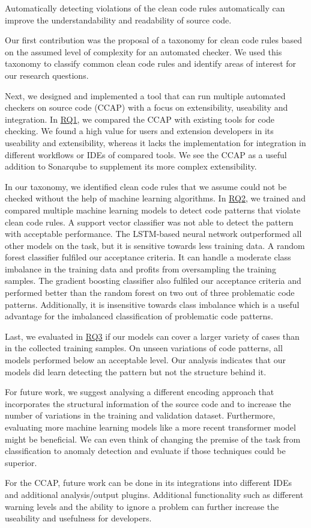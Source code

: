 

Automatically detecting violations of the clean code rules automatically can improve the understandability and readability of source code. 

Our first contribution was the proposal of a taxonomy for clean code rules based on the assumed level of complexity for an automated checker.
We used this taxonomy to classify common clean code rules and identify areas of interest for our research questions.

Next, we designed and implemented a tool that can run multiple automated checkers on source code (CCAP) with a focus on extensibility, useability and integration. In \hyperref[rq:1]{RQ1}, we compared the CCAP with existing tools for code checking. We found a high value for users and extension developers in its useability and extensibility, whereas it lacks the implementation for integration in different workflows or IDEs of compared tools. We see the CCAP as a useful addition to Sonarqube to supplement its more complex extensibility.

In our taxonomy, we identified clean code rules that we assume could not be checked without the help of machine learning algorithms. In \hyperref[rq:2]{RQ2}, we trained and compared multiple machine learning models to detect code patterns that violate clean code rules. A support vector classifier was not able to detect the pattern with acceptable performance. The LSTM-based neural network outperformed all other models on the task, but it is sensitive towards less training data.
A random forest classifier fulfiled our acceptance criteria. It can handle a moderate class imbalance in the training data and profits from oversampling the training samples. The gradient boosting classifier also fulfiled our acceptance criteria and performed better than the random forest on two out of three problematic code patterns. Additionally, it is insensitive towards class imbalance which is a useful advantage for the imbalanced classification of problematic code patterns.

Last, we evaluated in \hyperref[rq:3]{RQ3} if our models can cover a larger variety of cases than in the collected training samples. On unseen variations of code patterns, all models performed below an acceptable level. Our analysis indicates that our models did learn detecting the pattern but not the structure behind it.

\medskip
For future work, we suggest analysing a different encoding approach that incorporates the structural information of the source code and to increase the number of variations in the training and validation dataset. Furthermore, evaluating more machine learning models like a more recent transformer model might be beneficial. We can even think of changing the premise of the task from classification to anomaly detection and evaluate if those techniques could be superior.

For the CCAP, future work can be done in its integrations into different IDEs and additional analysis/output plugins. Additional functionality such as different warning levels and the ability to ignore a problem can further increase the useability and usefulness for developers.





